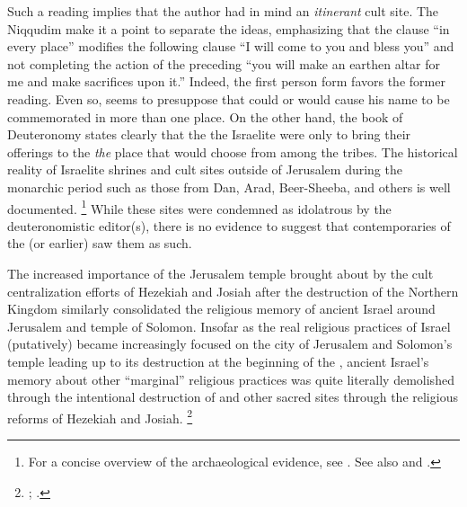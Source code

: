 Such a reading implies that the author had in mind an \emph{itinerant} cult site. The Niqqudim make it a point to separate the ideas, emphasizing that the clause  ``in every place'' modifies the following clause  ``I will come to you and bless you'' and not completing the action of the preceding  ``you will make an earthen altar for me and make sacrifices upon it.'' Indeed, the first person form  favors the former reading. Even so,  seems to presuppose that \yahweh could or would cause his name to be commemorated in more than one place. On the other hand, the book of Deuteronomy states clearly that the the Israelite were only to bring their offerings to the \emph{the} place that \yahweh would choose from among the tribes. The historical reality of Israelite shrines and cult sites outside of Jerusalem during the monarchic period such as those from Dan, Arad, Beer-Sheeba, and others is well documented.%
    \footnote{For a concise overview of the archaeological evidence, see \cite[319--352]{king-stager2001}. See also \cite{edelman_barton-stavrakopoulou2010} and \cite[160--181]{smith2002}.}
While these sites were condemned as idolatrous by the deuteronomistic editor(s), there is no evidence to suggest that contemporaries of the  (or earlier) saw them as such.

The increased importance of the Jerusalem temple brought about by the cult centralization efforts of Hezekiah and Josiah after the destruction of the Northern Kingdom similarly consolidated the religious memory of ancient Israel around Jerusalem and temple of Solomon. Insofar as the real religious practices of Israel (putatively) became increasingly focused on the city of Jerusalem and Solomon's temple leading up to its destruction at the beginning of the , ancient Israel's memory about other ``marginal'' religious practices was quite literally demolished through the intentional destruction of  and other sacred sites through the religious reforms of Hezekiah and Josiah.%
    \footnote{\cite[182--199]{smith2002}; \cite[191--209]{romer2015}.}

